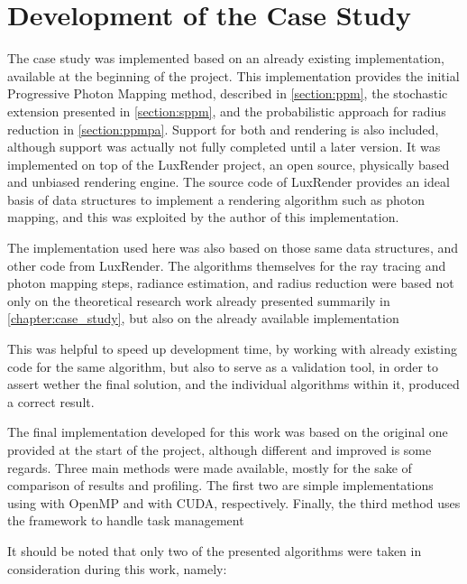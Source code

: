 \documentclass[main.tex]{subfiles}
\begin{document}
\chapter{Development of the Case Study} \label{section:impl}

The case study was implemented based on an already existing implementation, available at the beginning of the project. This implementation provides the initial Progressive Photon Mapping method, described in \cref{section:ppm}, the stochastic extension presented in \cref{section:sppm}, and the probabilistic approach for radius reduction in \cref{section:ppmpa}. Support for both \cpu and \cuda rendering is also included, although \cuda support was actually not fully completed until a later version. It was implemented on top of the LuxRender project, an open source, physically based and unbiased rendering engine. The source code of LuxRender provides an ideal basis of data structures to implement a rendering algorithm such as photon mapping, and this was exploited by the author of this implementation.

The implementation used here was also based on those same data structures, and other code from LuxRender. The algorithms themselves for the ray tracing and photon mapping steps, radiance estimation, and radius reduction were based not only on the theoretical research work already presented summarily in \cref{chapter:case_study}, but also on the already available implementation

This was helpful to speed up development time, by working with already existing code for the same algorithm, but also to serve as a validation tool, in order to assert wether the final solution, and the individual algorithms within it, produced a correct result.


The final implementation developed for this work was based on the original one provided at the start of the project, although different and improved is some regards. Three main methods were made available, mostly for the sake of comparison of results and profiling. The first two are simple implementations using \cpus with \acs{OpenMP} and \gpus with \acs{CUDA}, respectively. Finally, the third method uses the \starpu framework to handle task management

It should be noted that only two of the presented algorithms were taken in consideration during this work, namely:
\end{document}
